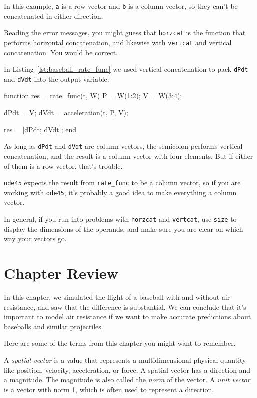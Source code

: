 In this example, \lstinline{a} is a row vector and \lstinline{b} is a column
vector, so they can't be concatenated in either direction.

Reading the error messages, you might guess that \lstinline{horzcat}
is the function that performs horizontal concatenation, and likewise
with \lstinline{vertcat} and vertical concatenation.  You would be correct.


In Listing~\ref{lst:baseball_rate_func} we used vertical concatenation to pack \lstinline{dPdt} and \lstinline{dVdt} into the output variable:

\begin{code}
function res = rate_func(t, W)
    P = W(1:2);
    V = W(3:4);

    dPdt = V;
    dVdt = acceleration(t, P, V);

    res = [dPdt; dVdt];
end
\end{code}

As long as \lstinline{dPdt} and \lstinline{dVdt} are column vectors,
the semicolon performs vertical concatenation, and the result is
a column vector with four elements.  But if either of them is a
row vector, that's trouble.


\lstinline{ode45} expects the result from \lstinline{rate_func} to be a
column vector, so if you are working with \lstinline{ode45}, it's
probably a good idea to make everything a column vector.

In general, if you run into problems with \lstinline{horzcat} and
\lstinline{vertcat}, use \lstinline{size} to display the dimensions of the operands,
and make sure you are clear on which way your vectors go.

\section{Chapter Review}

In this chapter, we simulated the flight of a baseball with and without air resistance, and saw that the difference is substantial.
We can conclude that it's important to model air resistance if we want to make accurate predictions about baseballs and similar projectiles.

Here are some of the terms from this chapter you might want to remember.

A \emph{spatial vector} is a value that represents a multidimensional physical quantity like position, velocity, acceleration, or force.
A spatial vector has a direction and a magnitude.  The magnitude is also called the \emph{norm} of the vector.
A \emph{unit vector} is a vector with norm 1, which is often used to represent a
direction.

